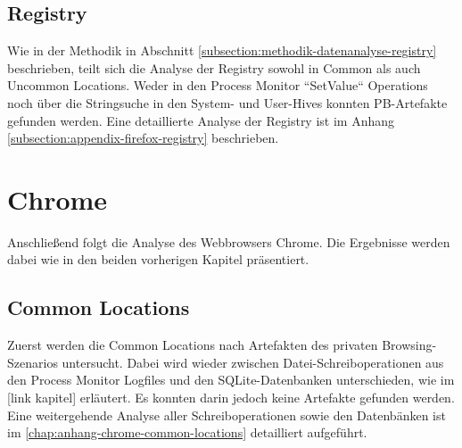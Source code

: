 \subsection*{Registry}
Wie in der Methodik in Abschnitt \ref{subsection:methodik-datenanalyse-registry} beschrieben, teilt sich die Analyse der Registry sowohl in Common als auch Uncommon Locations. Weder in den Process Monitor ``SetValue`` Operations noch über die Stringsuche in den System- und User-Hives konnten PB-Artefakte gefunden werden. Eine detaillierte Analyse der Registry ist im Anhang \ref{subsection:appendix-firefox-registry} beschrieben. 


\section{Chrome}\label{chap:ergebnisse-chrome}

Anschließend folgt die Analyse des Webbrowsers Chrome. Die Ergebnisse werden dabei wie in den beiden vorherigen Kapitel präsentiert.

\subsection*{Common Locations}\label{chap:ergebnisse-chrome-common-location}

Zuerst werden die Common Locations nach Artefakten des privaten Browsing-Szenarios untersucht. Dabei wird wieder zwischen Datei-Schreiboperationen aus den Process Monitor Logfiles und den SQLite-Datenbanken unterschieden, wie im [link kapitel] erläutert. Es konnten darin jedoch keine Artefakte gefunden werden.\\
Eine weitergehende Analyse aller Schreiboperationen sowie den Datenbänken ist im \autoref{chap:anhang-chrome-common-locations} detailliert aufgeführt.

